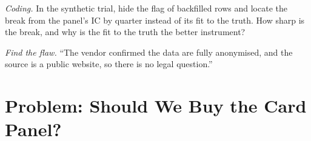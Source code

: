 \begin{exercise}[$\star\star\star$]\label{exo:rs:alternative-and-text-data:7}
\emph{Coding.} In the synthetic trial, hide the flag of backfilled rows and locate the break from the panel's IC by quarter instead of its fit to
the truth. How sharp is the break, and why is the fit to the truth the better instrument?
\end{exercise}

\begin{exercise}[$\star\star\star$]\label{exo:rs:alternative-and-text-data:8}
\emph{Find the flaw.} ``The vendor confirmed the data are fully anonymised, and the source is a public website, so there is no legal question.''
\end{exercise}

\section{Problem: Should We Buy the Card Panel?}

